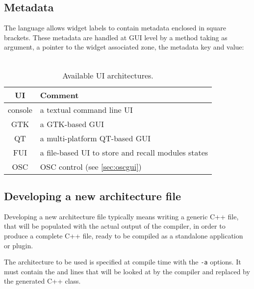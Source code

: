 \subsection{Metadata}
\label{sec:metadata}
The \faust language allows widget labels to contain metadata enclosed in square brackets. These metadata are handled at GUI level by a  method taking as argument, a pointer to the widget associated zone, the metadata key and value: \\
\htab{} \\


\begin{table}[htp]
\begin{center}
\begin{tabular}{|c|l|}
\hline
\bf{UI} & \bf{Comment} \\
\hline
console  & a textual command line UI \\
GTK  & a GTK-based GUI \\
QT   & a multi-platform QT-based GUI \\
FUI  & a file-based UI to store and recall modules states \\
OSC  & OSC control (see \ref{sec:oscgui}) \\
\hline
\end{tabular}
\end{center}
\caption{Available UI architectures.}
\label{tab:uiarch}
\end{table}%

\subsection{Developing a new architecture file}
\label{sec:architecture}

Developing a new architecture file typically means writing a generic C++ file, that will be populated with the actual output of the \faust compiler, in order to produce a complete C++ file, ready to be compiled as a standalone application or plugin. 

The architecture to be used is specified at compile time with the \lstinline'-a' options. It must contain the  and  lines that will be looked at by the \faust compiler and replaced by the generated C++ class. 


